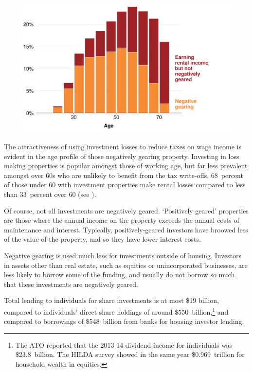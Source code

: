 \documentclass{grattan}\usepackage[]{graphicx}\usepackage[]{color}
\begin{document}
\begin{figure}[!htb]

\includegraphics[width=1.225\columnwidth]{CGT-NG-atlas//NG-PG-by-age-1}

\end{figure}

The attractiveness of using investment losses to reduce taxes on wage
income is evident in the age profile of those negatively gearing
property. Investing in loss making properties is popular amongst those
of working age, but far less prevalent amongst over 60s who are unlikely
to benefit from the tax write-offs. 68~percent of those under 60
with investment properties make rental losses compared to less than 33~percent over 60 (see ).

Of course, not all investments are negatively geared. `Positively geared' properties are those where the annual income on the property exceeds the annual costs of maintenance and interest. Typically, positively-geared investors have broowed less of the value of the property, and so they have lower interest costs.

Negative gearing is used much less for investments outside of housing. Investors in assets other than real estate, such as equities or unincorporated businesses, are less likely to borrow some of the funding, and usually do not borrow so much that these investments are negatively geared. 

Total lending to individuals for share investments is at most \$19 billion, compared to individuals' direct share holdings of around \$550~billion,\footnote{The ATO reported that the 2013-14 dividend income for individuals was \$23.8~billion. The HILDA survey showed in the same year \$0.969~trillion for household wealth in equities.}  and compared to borrowings of \$548~billion from banks for housing investor lending. 
\end{document}
